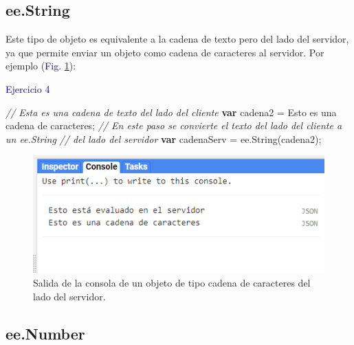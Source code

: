 \documentclass[
  12pt,
  letterpaper,
  twoside]{book}
\newenvironment{Shaded}{\begin{snugshade}}{\end{snugshade}}
\newcommand{\CommentTok}[1]{\textcolor[rgb]{0.24,0.58,0.00}{\textit{#1}}}
\newcommand{\ControlFlowTok}[1]{\textcolor[rgb]{0.00,0.00,0.00}{\textbf{#1}}}
\newcommand{\FunctionTok}[1]{\textcolor[rgb]{0.48,0.12,0.64}{#1}}
\newcommand{\KeywordTok}[1]{\textcolor[rgb]{0.48,0.12,0.64}{#1}}
\newcommand{\NormalTok}[1]{#1}
\newcommand{\OperatorTok}[1]{\textcolor[rgb]{0.00,0.00,0.00}{#1}}
\newcommand{\StringTok}[1]{\textcolor[rgb]{0.87,0.29,0.22}{#1}}
\begin{document}
\hypertarget{ee.string}{%
\subsection*{ee.String}\label{ee.string}}

Este tipo de objeto es equivalente a la cadena de texto pero del lado del servidor, ya que permite enviar un objeto como cadena de caracteres al servidor. Por ejemplo (\textcolor{darkblue}{Fig.} \ref{fig:f57}):

\textcolor{darkblue}{Ejercicio 4}

\begin{Shaded}
\begin{Highlighting}[]
\CommentTok{// Esta es una cadena de texto del lado del cliente}
\ControlFlowTok{var}\NormalTok{ cadena2 }\OperatorTok{=} \StringTok{\textquotesingle{}Esto es una cadena de caracteres\textquotesingle{}}\OperatorTok{;}
\CommentTok{// En este paso se convierte el texto del lado del cliente a un ee.String}
\CommentTok{// del lado del servidor}
\ControlFlowTok{var}\NormalTok{ cadenaServ }\OperatorTok{=} \KeywordTok{ee}\OperatorTok{.}\FunctionTok{String}\NormalTok{(cadena2)}\OperatorTok{;}                         
\end{Highlighting}
\end{Shaded}

\begin{figure}[H]

{\centering \includegraphics[width=0.95\linewidth]{Img/ej4} 

}

\caption{Salida de la consola de un objeto de tipo cadena de caracteres del lado del servidor.}\label{fig:f57}
\end{figure}

\hypertarget{ee.number}{%
\subsection*{ee.Number}\label{ee.number}}
\end{document}
